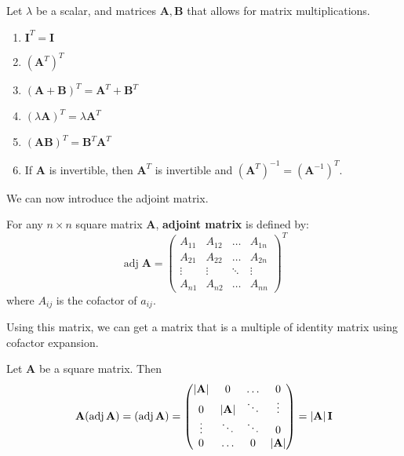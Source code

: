 \documentclass{huhtakm-template-book}
\DeclareMathOperator{\adj}{adj}
\begin{document}
\begin{lem}
    Let $\lambda$ be a scalar, and matrices $\mathbf{A},\mathbf{B}$ that allows for matrix multiplications.
    \begin{enumerate}
        \item $\mathbf{I}^{T}=\mathbf{I}$
        \item $(\mathbf{A}^{T})^{T}$
        \item $(\mathbf{A}+\mathbf{B})^{T}=\mathbf{A}^{T}+\mathbf{B}^{T}$
        \item $(\lambda\mathbf{A})^{T}=\lambda\mathbf{A}^{T}$
        \item $(\mathbf{AB})^{T}=\mathbf{B}^{T}\mathbf{A}^{T}$
        \item If $\mathbf{A}$ is invertible, then $\mathbf{A}^{T}$ is invertible and $(\mathbf{A}^{T})^{-1}=(\mathbf{A}^{-1})^{T}$.
    \end{enumerate}
\end{lem}
We can now introduce the adjoint matrix.
\begin{defn}
    For any $n\times n$ square matrix $\mathbf{A}$, \textbf{adjoint matrix} is defined by:
    \begin{equation*}
        \adj\mathbf{A}=\begin{pmatrix}
            A_{11} & A_{12} & \hdots & A_{1n}\\
            A_{21} & A_{22} & \hdots & A_{2n}\\
            \vdots & \vdots & \ddots & \vdots\\
            A_{n1} & A_{n2} & \hdots & A_{nn}
        \end{pmatrix}^{T}
    \end{equation*}
    where $A_{ij}$ is the cofactor of $a_{ij}$.
\end{defn}
Using this matrix, we can get a matrix that is a multiple of identity matrix using cofactor expansion.
\begin{thm}
    Let $\mathbf{A}$ be a square matrix. Then
    \begin{equation*}
        \mathbf{A}(\adj\mathbf{A})=(\adj\mathbf{A})=\begin{pmatrix}
            \abs{\mathbf{A}} & 0 & \hdots & 0\\
            0 & \abs{\mathbf{A}} & \ddots & \vdots\\
            \vdots & \ddots & \ddots & 0\\
            0 & \hdots & 0 & \abs{\mathbf{A}}
        \end{pmatrix}=\abs{\mathbf{A}}\mathbf{I}
    \end{equation*}
\end{thm}
\end{document}
